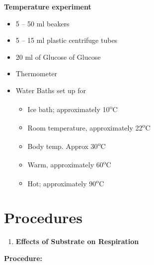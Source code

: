 \documentclass[
  letterpaper,
  DIV=11,
  numbers=noendperiod]{scrreprt}
\providecommand{\tightlist}{%
  \setlength{\itemsep}{0pt}\setlength{\parskip}{0pt}}
\begin{document}
\textbf{Temperature experiment}

\begin{itemize}
\item
  5 -- 50 ml beakers
\item
  5 -- 15 ml plastic centrifuge tubes
\item
  20 ml of Glucose of Glucose
\item
  Thermometer
\item
  Water Baths set up for

  \begin{itemize}
  \item
    Ice bath; approximately 10\textsuperscript{o}C
  \item
    Room temperature, approximately 22\textsuperscript{o}C
  \item
    Body temp. Approx 30\textsuperscript{o}C
  \item
    Warm, approximately 60\textsuperscript{o}C
  \item
    Hot; approximately 90\textsuperscript{o}C
  \end{itemize}
\end{itemize}

\section{\texorpdfstring{\textbf{Procedures}}{Procedures}}\label{procedures}

\begin{enumerate}
\def\labelenumi{\Alph{enumi}.}
\tightlist
\item
  \textbf{Effects of Substrate on Respiration}
\end{enumerate}

\textbf{Procedure:}
\end{document}
